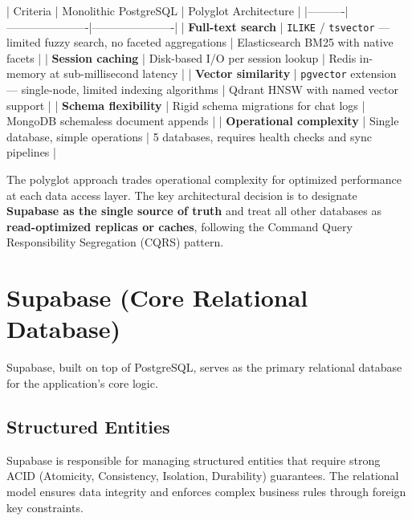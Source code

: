 | Criteria | Monolithic PostgreSQL | Polyglot Architecture |
|----------|----------------------|----------------------|
| \textbf{Full-text search} | \texttt{ILIKE} / \texttt{tsvector} — limited fuzzy search, no faceted aggregations | Elasticsearch BM25 with native facets |
| \textbf{Session caching} | Disk-based I/O per session lookup | Redis in-memory at sub-millisecond latency |
| \textbf{Vector similarity} | \texttt{pgvector} extension — single-node, limited indexing algorithms | Qdrant HNSW with named vector support |
| \textbf{Schema flexibility} | Rigid schema migrations for chat logs | MongoDB schemaless document appends |
| \textbf{Operational complexity} | Single database, simple operations | 5 databases, requires health checks and sync pipelines |

The polyglot approach trades operational complexity for optimized performance at each data access layer. The key architectural decision is to designate \textbf{Supabase as the single source of truth} and treat all other databases as \textbf{read-optimized replicas or caches}, following the Command Query Responsibility Segregation (CQRS) pattern.

\section{Supabase (Core Relational Database)}

Supabase, built on top of PostgreSQL, serves as the primary relational database for the application's core logic.

\subsection{Structured Entities}
Supabase is responsible for managing structured entities that require strong ACID (Atomicity, Consistency, Isolation, Durability) guarantees. The relational model ensures data integrity and enforces complex business rules through foreign key constraints.

